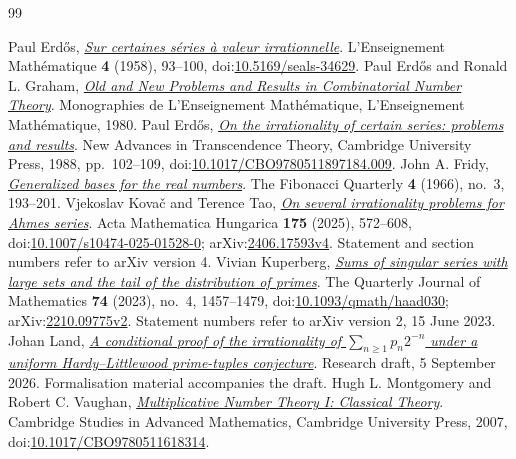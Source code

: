 \documentclass[11pt]{article}
\begin{document}
\begin{thebibliography}{99}
\small\raggedright\setlength{\itemsep}{0pt}
 Paul Erd\H{o}s, \href{https://users.renyi.hu/~p_erdos/1958-19.pdf}{\emph{Sur certaines s\'eries \`a valeur irrationnelle}}.
  L'Enseignement Mathématique \textbf{4} (1958), 93--100, doi:\href{https://doi.org/10.5169/seals-34629}{10.5169/seals-34629}.
 Paul Erd\H{o}s and Ronald L. Graham, \href{https://mathweb.ucsd.edu/~ronspubs/80_11_number_theory.pdf}{\emph{Old and New Problems and Results in Combinatorial Number Theory}}.
  Monographies de L'Enseignement Mathématique, L'Enseignement Mathématique, 1980.
 Paul Erd\H{o}s, \href{https://doi.org/10.1017/CBO9780511897184.009}{\emph{On the irrationality of certain series: problems and results}}.
  New Advances in Transcendence Theory, Cambridge University Press, 1988, pp.~102--109, doi:\href{https://doi.org/10.1017/CBO9780511897184.009}{10.1017/CBO9780511897184.009}.
 John A. Fridy, \href{https://www.fq.math.ca/Scanned/4-3/fridy.pdf}{\emph{Generalized bases for the real numbers}}.
  The Fibonacci Quarterly \textbf{4} (1966), no.~3, 193--201.
 Vjekoslav Kova\v{c} and Terence Tao, \href{https://arxiv.org/abs/2406.17593v4}{\emph{On several irrationality problems for Ahmes series}}.
  Acta Mathematica Hungarica \textbf{175} (2025), 572--608, doi:\href{https://doi.org/10.1007/s10474-025-01528-0}{10.1007/s10474-025-01528-0}; arXiv:\href{https://arxiv.org/abs/2406.17593v4}{2406.17593v4}. Statement and section numbers refer to arXiv version 4.
 Vivian Kuperberg, \href{https://arxiv.org/abs/2210.09775v2}{\emph{Sums of singular series with large sets and the tail of the distribution of primes}}.
  The Quarterly Journal of Mathematics \textbf{74} (2023), no.~4, 1457--1479, doi:\href{https://doi.org/10.1093/qmath/haad030}{10.1093/qmath/haad030}; arXiv:\href{https://arxiv.org/abs/2210.09775v2}{2210.09775v2}. Statement numbers refer to arXiv version 2, 15 June 2023.
 Johan Land, \href{https://github.com/beetree/math_erdos_251}{\emph{A conditional proof of the irrationality of $\sum_{n\ge1}p_n2^{-n}$ under a uniform Hardy--Littlewood prime-tuples conjecture}}.
  Research draft, 5 September 2026. Formalisation material accompanies the draft.
 Hugh L. Montgomery and Robert C. Vaughan, \href{https://doi.org/10.1017/CBO9780511618314}{\emph{Multiplicative Number Theory I: Classical Theory}}.
  Cambridge Studies in Advanced Mathematics, Cambridge University Press, 2007, doi:\href{https://doi.org/10.1017/CBO9780511618314}{10.1017/CBO9780511618314}.

\end{thebibliography}
\end{document}

